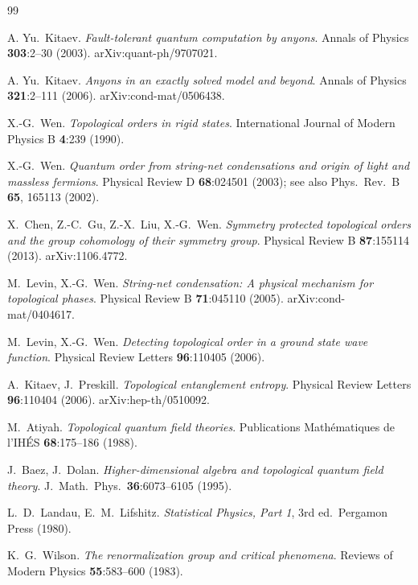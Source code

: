 \documentclass[12pt]{article}
\theoremstyle{plain}
\theoremstyle{definition}
\theoremstyle{remark}
\begin{document}
\begin{thebibliography}{99}

A. Yu.\ Kitaev. \emph{Fault-tolerant quantum computation by anyons}. Annals of Physics
\textbf{303}:2--30 (2003). arXiv:quant-ph/9707021.

A. Yu.\ Kitaev. \emph{Anyons in an exactly solved model and beyond}. Annals of Physics
\textbf{321}:2--111 (2006). arXiv:cond-mat/0506438.

X.-G.\ Wen. \emph{Topological orders in rigid states}. International Journal of Modern
Physics B \textbf{4}:239 (1990).

X.-G.\ Wen. \emph{Quantum order from string-net condensations and origin of light and
massless fermions}. Physical Review D \textbf{68}:024501 (2003); see also Phys.\ Rev.\ B
\textbf{65}, 165113 (2002).

X.\ Chen, Z.-C.\ Gu, Z.-X.\ Liu, X.-G.\ Wen. \emph{Symmetry protected topological orders
and the group cohomology of their symmetry group}. Physical Review B \textbf{87}:155114
(2013). arXiv:1106.4772.

M.\ Levin, X.-G.\ Wen. \emph{String-net condensation: A physical mechanism for
topological phases}. Physical Review B \textbf{71}:045110 (2005).
arXiv:cond-mat/0404617.

M.\ Levin, X.-G.\ Wen. \emph{Detecting topological order in a ground state wave
function}. Physical Review Letters \textbf{96}:110405 (2006).

A.\ Kitaev, J.\ Preskill. \emph{Topological entanglement entropy}. Physical Review
Letters \textbf{96}:110404 (2006). arXiv:hep-th/0510092.

M.\ Atiyah. \emph{Topological quantum field theories}. Publications Math\'ematiques de
l'IH\'ES \textbf{68}:175--186 (1988).

J.\ Baez, J.\ Dolan. \emph{Higher-dimensional algebra and topological quantum field
theory}. J.\ Math.\ Phys.\ \textbf{36}:6073--6105 (1995).

L.\ D.\ Landau, E.\ M.\ Lifshitz. \emph{Statistical Physics, Part 1}, 3rd ed.\ Pergamon
Press (1980).

K.\ G.\ Wilson. \emph{The renormalization group and critical phenomena}. Reviews of
Modern Physics \textbf{55}:583--600 (1983).


\end{thebibliography}
\end{document}
